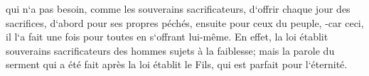 \verse qui n`a pas besoin, comme les souverains sacrificateurs, d`offrir chaque jour des sacrifices, d`abord pour ses propres péchés, ensuite pour ceux du peuple, -car ceci, il l`a fait une fois pour toutes en s`offrant lui-même. 
\verse En effet, la loi établit souverains sacrificateurs des hommes sujets à la faiblesse; mais la parole du serment qui a été fait après la loi établit le Fils, qui est parfait pour l`éternité. 

\chapter{}

